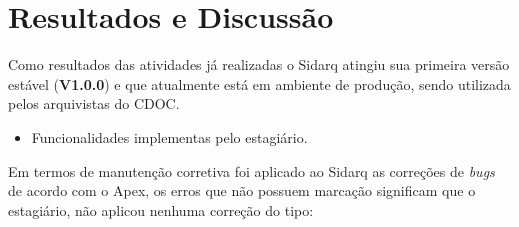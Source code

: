 \chapter[Resultados e Discussão]{Resultados e Discussão}

Como resultados das atividades já realizadas o Sidarq atingiu sua primeira versão estável (\textbf{V1.0.0}) e que atualmente está em ambiente de produção, sendo utilizada pelos arquivistas do CDOC.

\begin{itemize}
	\item Funcionalidades implementas pelo estagiário.
\end{itemize}

Em termos de manutenção corretiva foi aplicado ao Sidarq as correções de \textit{bugs} de acordo com o Apex, os erros que não possuem marcação significam que o estagiário, não aplicou nenhuma correção do tipo: 

